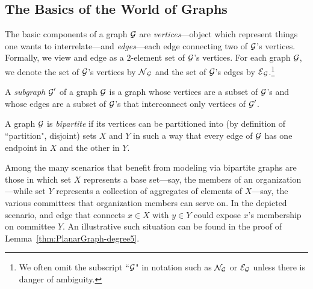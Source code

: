 \subsection{The Basics of the World of Graphs}

The basic components of a graph $\mbox{$\cal G$}$ are {\it vertices}---object which represent things one wants to interrelate---and {\it edges}---each edge connecting two of $\mbox{$\cal G$}$'s vertices.  Formally, we view and edge as a $2$-element set of $\mbox{$\cal G$}$'s vertices.  For each graph $\mbox{$\cal G$}$, we denote the set of $\mbox{$\cal G$}$'s vertices by $\mbox{$\cal N$}_{\mbox{{\scriptsize $\cal G$}}}$ and the set of $\mbox{$\cal G$}$'s edges by $\mbox{$\cal E$}_{\mbox{{\scriptsize $\cal G$}}}$.\footnote{We often omit the subscript ``$\mbox{$\cal G$}$" in notation such as ${\cal N}_{\cal G}$ or ${\cal E}_{\cal G}$ unless 
there is danger of ambiguity.}

\bigskip

\noindent {}

\bigskip

\noindent
A {\it subgraph} $\mbox{$\cal G$}'$ of a graph $\mbox{$\cal G$}$ is a graph whose vertices are a subset of $\mbox{$\cal G$}$'s and
whose edges are a subset of $\mbox{$\cal G$}$'s that interconnect only vertices of $\mbox{$\cal G$}'$.

\medskip

A graph $\mbox{$\cal G$}$ is {\em bipartite} if its vertices can be partitioned into (by definition of ``partition", disjoint) sets $X$ and $Y$ in such a way that every edge of $\mbox{$\cal G$}$ has one endpoint in $X$ and the other in $Y$.

\smallskip

Among the many scenarios that benefit from modeling via bipartite graphs are those in which set $X$ represents a base set---say, the members of an organization---while set $Y$ represents a collection of aggregates of elements of $X$---say, the various committees that organization members can serve on.  In the depicted scenario, and edge that connects $x \in X$ with $y \in Y$ could expose $x$'s membership on committee $Y$.  An illustrative such situation can be found in the proof of Lemma~\ref{thm:PlanarGraph-degree5}.


